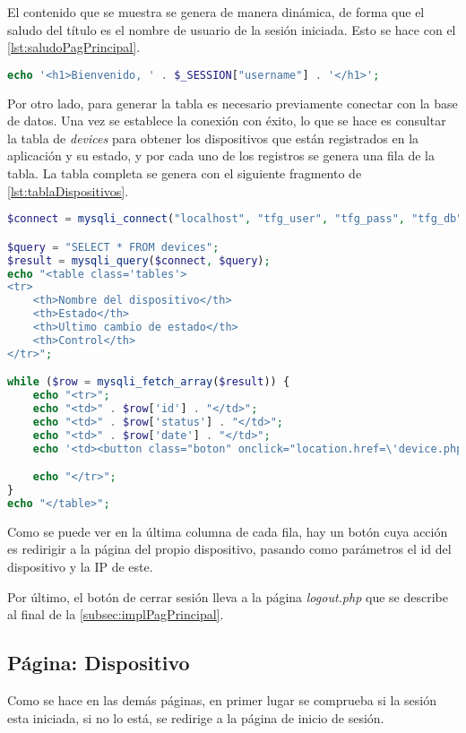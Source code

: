 El contenido que se muestra se genera de manera dinámica, de forma que el saludo del título es el nombre de usuario de la sesión iniciada. Esto se hace con el \autoref{lst:saludoPagPrincipal}.
\pagebreak

\begin{lstlisting}[language=PHP, caption=Saludo página principal, label=lst:saludoPagPrincipal]
echo '<h1>Bienvenido, ' . $_SESSION["username"] . '</h1>';
\end{lstlisting}

Por otro lado, para generar la tabla es necesario previamente conectar con la base de datos. Una vez se establece la conexión con éxito, lo que se hace es consultar la tabla de \textit{devices} para obtener los dispositivos que están registrados en la aplicación y su estado, y por cada uno de los registros se genera una fila de la tabla. La tabla completa se genera con el siguiente fragmento de \autoref{lst:tablaDispositivos}.
\begin{lstlisting}[language=PHP, caption=Visualización de tabla de dispositivos, label=lst:tablaDispositivos]
$connect = mysqli_connect("localhost", "tfg_user", "tfg_pass", "tfg_db");

$query = "SELECT * FROM devices";
$result = mysqli_query($connect, $query);
echo "<table class='tables'>
<tr>
    <th>Nombre del dispositivo</th>
    <th>Estado</th>
    <th>Ultimo cambio de estado</th>
    <th>Control</th>
</tr>";

while ($row = mysqli_fetch_array($result)) {
    echo "<tr>";
    echo "<td>" . $row['id'] . "</td>";
    echo "<td>" . $row['status'] . "</td>";
    echo "<td>" . $row['date'] . "</td>";
    echo '<td><button class="boton" onclick="location.href=\'device.php?id=' . $row['id'] . '&ip=' . $row['ip'] . '\'">Acceder</button></td>';

    echo "</tr>";
}
echo "</table>";
\end{lstlisting}

Como se puede ver en la última columna de cada fila, hay un botón cuya acción es redirigir a la página del propio dispositivo, pasando como parámetros el id del dispositivo y la IP de este.

Por último, el botón de cerrar sesión lleva a la página \textit{logout.php} que se describe al final de la \autoref{subsec:implPagPrincipal}.

\subsection{Página: Dispositivo}\label{subsec:página-dispositivo}
Como se hace en las demás páginas, en primer lugar se comprueba si la sesión esta iniciada, si no lo está, se redirige a la página de inicio de sesión.

